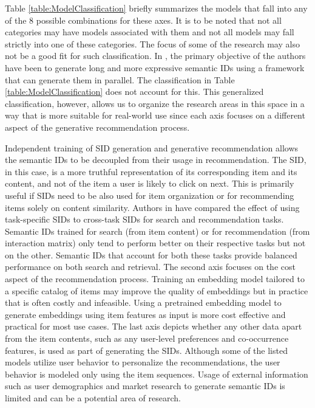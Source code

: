 \documentclass[11pt,a4paper]{article}
\begin{document}
Table \ref{table:ModelClassification} briefly summarizes the models that fall into any of the 8 possible combinations for these axes. It is to be noted that not all categories may have models associated with them and not all models may fall strictly into one of these categories. The focus of some of the research may also not be a good fit for such classification. In \cite{2025RPG_hou2025generatinglongsemanticids}, the primary objective of the authors have been to generate long and more expressive semantic IDs using a framework that can generate them in parallel. The classification in Table \ref{table:ModelClassification} does not account for this. This generalized classification, however, allows us to organize the research areas in this space in a way that is more suitable for real-world use since each axis focuses on a different aspect of the generative recommendation process.

Independent training of SID generation and generative recommendation allows the semantic IDs to be decoupled from their usage in recommendation. The SID, in this case, is a more truthful representation of its corresponding item and its content, and not of the item a user is likely to click on next. This is primarily useful if SIDs need to be also used for item organization or for recommending items solely on content similarity. Authors in \cite{JointSR_10.1145/3705328.3759300} have compared the effect of using task-specific SIDs to cross-task SIDs for search and recommendation tasks. Semantic IDs trained for search (from item content) or for recommendation (from interaction matrix) only tend to perform better on their respective tasks but not on the other. Semantic IDs that account for both these tasks provide balanced performance on both search and retrieval. The second axis focuses on the cost aspect of the recommendation process. Training an embedding model tailored to a specific catalog of items may improve the quality of embeddings but in practice that is often costly and infeasible. Using a pretrained embedding model to generate embeddings using item features as input is more cost effective and practical for most use cases. The last axis depicts whether any other data apart from the item contents, such as any user-level preferences and co-occurrence features, is used as part of generating the SIDs. Although some of the listed models utilize user behavior to personalize the recommendations, the user behavior is modeled only using the item sequences. Usage of external information such as user demographics and market research to generate semantic IDs is limited and can be a potential area of research.
\end{document}
